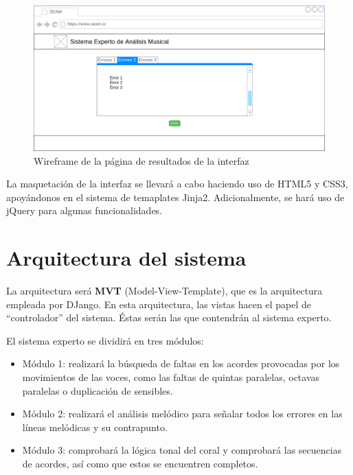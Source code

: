 \begin{figure}[H]
	\centering
	\includegraphics[scale=0.4]{imagenes/interfaz2.png}
	\caption{Wireframe de la página de resultados de la interfaz}
	\label{fig4.1.2.2}
\end{figure}

La maquetación de la interfaz se llevará a cabo haciendo uso de HTML5 y CSS3, apoyándonos en el sistema de temaplates Jinja2. Adicionalmente, se hará uso de jQuery para algunas funcionalidades.

\section{Arquitectura del sistema}

La arquitectura será \textbf{MVT} (Model-View-Template), que es la arquitectura empleada por DJango. En esta arquitectura, las vistas hacen el papel de ``controlador'' del sistema. Éstas serán las que contendrán al sistema experto.  

El sistema experto se dividirá en tres módulos:

\begin{itemize}

	\item Módulo 1: realizará la búsqueda de faltas en los acordes provocadas por los movimientos de las voces, como las faltas de quintas paralelas, octavas paralelas o duplicación de sensibles.

	\item Módulo 2: realizará el análisis melódico para señalar todos los errores en las líneas melódicas y su contrapunto.

	\item Módulo 3: comprobará la lógica tonal del coral y comprobará las secuencias de acordes, así como que estos se encuentren completos. 

\end{itemize}

